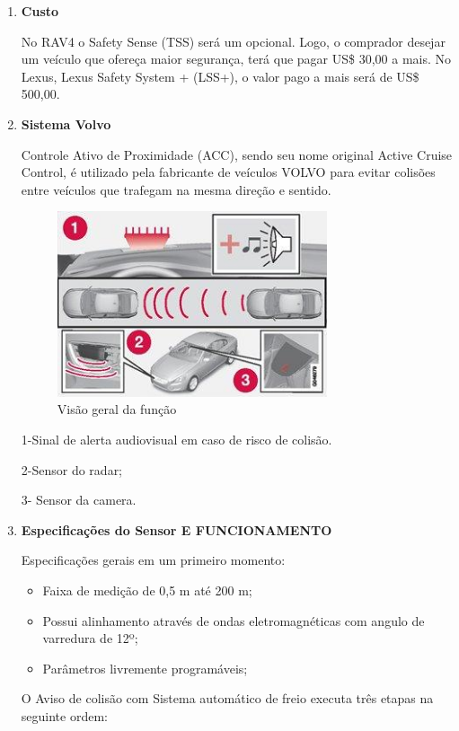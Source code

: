 \begin{enumerate}
\item \textbf{Custo}

  No RAV4 o Safety Sense (TSS) será um opcional. Logo, o comprador desejar um
  veículo que ofereça maior segurança, terá que pagar US\$ 30,00 a mais. No
  Lexus,  Lexus Safety System + (LSS+), o valor pago a mais será de US\$
  500,00.  \cite{1comper}

\item \textbf{Sistema Volvo}

Controle Ativo de Proximidade (ACC), sendo seu nome original Active Cruise
Control, é utilizado pela fabricante de veículos VOLVO para evitar colisões
entre veículos que trafegam na mesma direção e sentido.

\begin{figure}[h]
  \centering
  \includegraphics[width=300px, scale=1]{figuras/esquematico_volvo}
  \caption{Visão geral da função \cite{8comper}}
\label{fig:esquematico_volvo}
\end{figure}

1-Sinal de alerta audiovisual em caso de risco de colisão.

2-Sensor do radar;

3- Sensor da camera.

\item \textbf{Especificações do Sensor E FUNCIONAMENTO}

Especificações gerais em um primeiro momento:

\begin{itemize}
  \item Faixa de medição de 0,5 m até 200 m;
  \item Possui alinhamento através de ondas eletromagnéticas com angulo de varredura de 12º;
  \item Parâmetros livremente programáveis;
\end{itemize}

O Aviso de colisão com Sistema automático de freio executa três etapas na seguinte ordem:


\end{enumerate}
